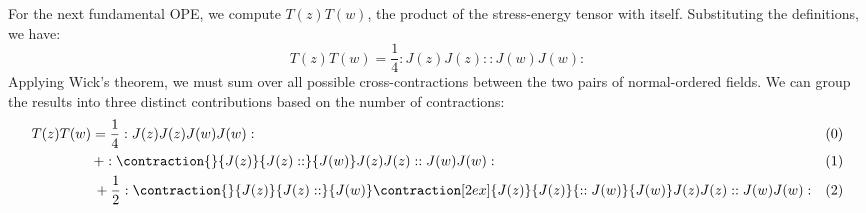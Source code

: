 For the next fundamental OPE, we compute \(T(z)T(w)\), the product of the stress-energy tensor with itself. Substituting the definitions, we have:
\[
    T(z)T(w) = \frac{1}{4} :J(z)J(z): :J(w)J(w):
\]
Applying Wick's theorem, we must sum over all possible cross-contractions between the two pairs of normal-ordered fields. We can group the results into three distinct contributions based on the number of contractions:
\[
    \begin{aligned}
        T(z)T(w) & = \frac{1}{4} :J(z)J(z)J(w)J(w):                                                                                             & (0) \\
                 & \, + :\contraction{}{J(z)}{J(z)::}{J(w)} J(z) J(z):: J(w)J(w) :                                                              & (1) \\
                 & \, + \frac{1}{2} : \contraction{}{J(z)}{J(z) :: }{J(w)} \contraction[2ex]{J(z)}{J(z)}{ :: J(w)}{J(w)} J(z)J(z) :: J(w)J(w) : & (2)
    \end{aligned}
\]
